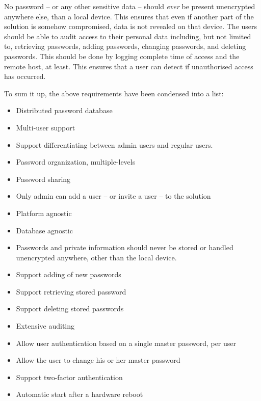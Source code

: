 			No password -- or any other sensitive data -- should \emph{ever} be present unencrypted anywhere else, than a local device. This ensures that even if another part of the solution is somehow compromised, data is not revealed on that device.  The users should be able to audit access to their personal data including, but not limited to, retrieving passwords, adding passwords, changing passwords, and deleting passwords. This should be done by logging complete time of access and the remote host, at least. This ensures that a user can detect if unauthorised access has occurred.

			To sum it up, the above requirements have been condensed into a list:
			\vspace{-3ex}\begin{itemize}
				\setlength\itemsep{0.1em}
				\item Distributed password database
				\item Multi-user support
				\item Support differentiating between admin users and regular users.
				\item Password organization, multiple-levels
				\item Password sharing
				\item Only admin can add a user -- or invite a user -- to the solution
				\item Platform agnostic
				\item Database agnostic
				\item Passwords and private information should never be stored or handled unencrypted anywhere, other than the local device.
				\item Support adding of new passwords
				\item Support retrieving stored password
				\item Support deleting stored passwords
				\item Extensive auditing
				\item Allow user authentication based on a single master password, per user
				\item Allow the user to change his or her master password
				\item Support two-factor authentication
				\item Automatic start after a hardware reboot
			\end{itemize}


